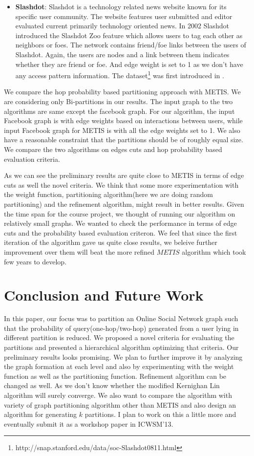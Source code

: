 \documentclass[letterpaper]{article}
\begin{document}
\begin{itemize}
\item \textbf{Slashdot}: Slashdot is a technology related news website known
for its specific user community.  The website features user submitted and
editor evaluated current primarily technology oriented news.  In 2002 Slashdot
introduced the Slashdot Zoo feature which allows users to tag each other as
neighbors or foes.  The network contains friend/foe links between the users of
Slashdot. Again, the users are nodes and a link between them indicates whether
they are friend or foe. And edge weight is set to 1 as we don't have any access
pattern information. The
dataset\footnote{http://snap.stanford.edu/data/soc-Slashdot0811.html} was first
introduced in \cite{25}.

\end{itemize}
We compare the hop probability based partitioning approach with METIS. We are
considering only Bi-partitions in our results. The input graph to the two
algorithms are same except the facebook graph. For our algorithm, the input
Facebook graph is with edge weights based on  interactions between users, while
input Facebook graph for METIS is with all the edge weights set to 1.
We also have a reasonable constraint that the partitions should be of
roughly equal size. We compare the two algorithms on edges cuts and hop
probability based evaluation criteria. 

As we can see the preliminary results
are quite close to METIS in terms of edge cuts as well the novel criteria. We
think that some more experimentation with the weight function, partitioning
algorithm(here we are doing random partitioning) and the refinement algorithm,
might result in better results. Given the time span for the course project,
we thought of running our algorithm on relatively small graphs. We wanted to check the performance
in terms of edge cuts and the probability based evaluation criteron. We feel that
since the first iteration of the algorithm gave us quite close results, we beleive further improvement
over them will beat the more refined $METIS$ algorithm which took few years to develop. 


\section{Conclusion and Future Work}
In this paper, our focus was to partition an Online Social Network graph such
that the probability of query(one-hop/two-hop) generated from a user lying in
different partition is reduced. We proposed a novel criteria for evaluating the
partitions and presented a hierarchical algorithm optimizing that criteria. Our
preliminary results looks promising. We plan to further improve it by 
analyzing the graph formation at each level and also by experimenting with the
weight function as well as the partitioning function. Refinement algorithm can
be changed as well. As we don't know whether the modified Kernighan Lin
algorithm will surely converge. We also want to compare the algorithm 
with variety of graph partitioning algorithm other than METIS and also design 
an algorithm for generating $k$ partitions. I plan to work on this a little more and 
 eventually submit it as a workshop paper in ICWSM'13.
 
\end{document}

